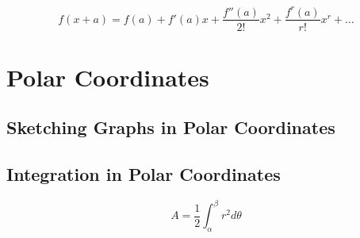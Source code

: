 \documentclass[a4paper,9pt]{scrartcl}
\begin{document}
    \begin{displaymath}
        f(x + a) = f(a) + f'(a)x + \frac{f''(a)}{2!}x^2 + \frac{f^{r}(a)}{r!}x^r + \dots
    \end{displaymath}


    \section{Polar Coordinates}

    \subsection{Sketching Graphs in Polar Coordinates}
%
%

    \subsection{Integration in Polar Coordinates}

    \begin{displaymath}
        A = \frac{1}{2}\int_{\alpha}^{\beta} r^2 d\theta
    \end{displaymath}
\end{document}

